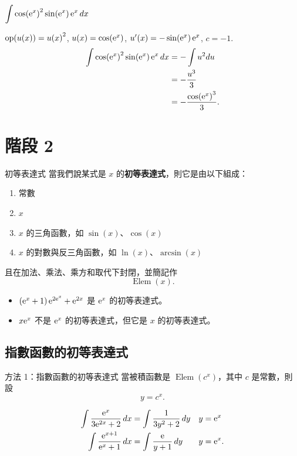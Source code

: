 \documentclass{beamer}
\newcommand{\Left} {\mathopen{}\mathclose\bgroup\left}
\newcommand{\Right}{\aftergroup\egroup\right}
\newcommand{\e}{\textup e}
\newcommand{\op}  {\operatorname{op}}
\newcommand{\Elem}{\operatorname{Elem}}
\theoremstyle{remark}
\begin{document}
\begin{frame}{$\displaystyle \int \cos \Left( \e^x \Right)^2 \sin(\e^x)\,\e^x\,dx$}
  \begin{solution}
    $\op(u(x)) = u \Left( x \Right)^2$, $u(x) = \cos(\e^x)$, $u'(x) = -\sin(\e^x)\,\e^x$, $c = -1$.
    \begin{align*}
      \int \cos \Left( \e^x \Right)^2 \sin(\e^x)\,\e^x\,dx &= -\int u^2 du\\
	&= -\frac{u^3}{3}\\
	&= -\frac{\cos \Left( \e^x \Right)^3}{3}.
    \end{align*}
  \end{solution}
\end{frame}

\section{階段 2}
\begin{frame}{初等表達式}
  當我們說某式是 $x$ 的\textbf{初等表達式}，則它是由以下組成：
  \begin{enumerate}
    \item 常數
    \item $x$
    \item $x$ 的三角函數，如 $\sin(x)$、$\cos(x)$
    \item $x$ 的對數與反三角函數，如 $\ln(x)$、$\arcsin(x)$
  \end{enumerate}
  且在加法、乘法、乘方和取代下封閉，並簡記作
  \[\Elem(x).\]
  \begin{example}
    \begin{itemize}
      \item $\left( \e^x + 1 \right) \e^{2\e^x} + \e^{2x}$ 是 $\e^x$ 的初等表達式。
      \item $x\e^x$ 不是 $\e^x$ 的初等表達式，但它是 $x$ 的初等表達式。
    \end{itemize}
  \end{example}
\end{frame}

\subsection[指數替代]{指數函數的初等表達式}
\begin{frame}{方法 1：指數函數的初等表達式}
  當被積函數是 $\Elem(c^x)$，其中 $c$ 是常數，則設
  \[y = c^x.\]
  \begin{example}
    \begin{align*}
      \int \frac{\e^x}{3\e^{2x} + 2}\,dx &= \int \frac{1}{3y^2 + 2}\,dy & y = \e^x\phantom.\\
      \int \frac{\e^{x+1}}{\e^x + 1}\,dx &= \int \frac{\e}{y + 1}\,dy   & y = \e^x.
    \end{align*}
  \end{example}
\end{frame}
\end{document}
